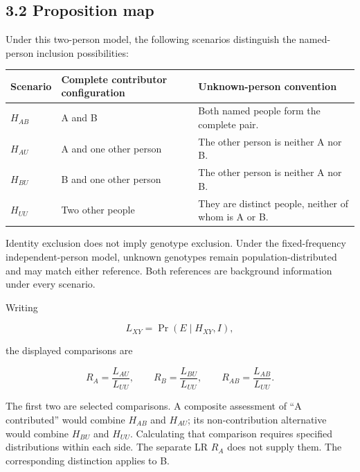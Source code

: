 \documentclass[
]{article}
\newcounter{none} %
\begin{document}
\subsection{3.2 Proposition map}\label{proposition-map}

Under this two-person model, the following scenarios distinguish the
named-person inclusion possibilities:

{\def\LTcaptype{none} %
\begin{longtable}[]{@{}
  >{\raggedright\arraybackslash}p{}
  >{\raggedright\arraybackslash}p{}
  >{\raggedright\arraybackslash}p{}@{}}
\toprule\noalign{}
\begin{minipage}[b]{\linewidth}\raggedright
Scenario
\end{minipage} & \begin{minipage}[b]{\linewidth}\raggedright
Complete contributor configuration
\end{minipage} & \begin{minipage}[b]{\linewidth}\raggedright
Unknown-person convention
\end{minipage} \\
\midrule\noalign{}
\endhead
\bottomrule\noalign{}
\endlastfoot
\(H_{AB}\) & A and B & Both named people form the complete pair. \\
\(H_{AU}\) & A and one other person & The other person is neither A nor
B. \\
\(H_{BU}\) & B and one other person & The other person is neither A nor
B. \\
\(H_{UU}\) & Two other people & They are distinct people, neither of
whom is A or B. \\
\end{longtable}
}

Identity exclusion does not imply genotype exclusion. Under the
fixed-frequency independent-person model, unknown genotypes remain
population-distributed and may match either reference. Both references
are background information under every scenario.

Writing

\[
L_{XY}=\Pr(E\mid H_{XY},I),
\]

the displayed comparisons are

\[
R_A=\frac{L_{AU}}{L_{UU}},\qquad
R_B=\frac{L_{BU}}{L_{UU}},\qquad
R_{AB}=\frac{L_{AB}}{L_{UU}}.
\]

The first two are selected comparisons. A composite assessment of ``A
contributed'' would combine \(H_{AB}\) and \(H_{AU}\); its
non-contribution alternative would combine \(H_{BU}\) and \(H_{UU}\).
Calculating that comparison requires specified distributions within each
side. The separate LR \(R_A\) does not supply them. The corresponding
distinction applies to B.
\end{document}
